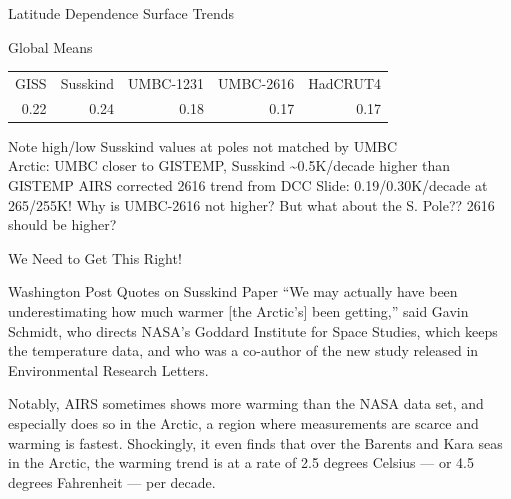 \documentclass[10pt,t]{beamer}
\begin{document}
\begin{frame}[label={sec:org564d78e}]{Latitude Dependence Surface Trends}
\vspace{-0.15in}
\begin{footnotesize}
Global Means
\vspace{-0.1in}
\begin{center}
\begin{tabular}{rrrrr}
GISS & Susskind & UMBC-1231 & UMBC-2616 & HadCRUT4\\
0.22 & 0.24 & 0.18 & 0.17 & 0.17\\
\end{tabular}
\end{center}
\vspace{-0.03in}
\end{footnotesize}
\begin{footnotesize}
Note high/low Susskind values at poles not matched by UMBC\\
Arctic: UMBC closer to GISTEMP, Susskind \textasciitilde{}0.5K/decade higher than GISTEMP
AIRS corrected 2616 trend from DCC Slide: 0.19/0.30K/decade at 265/255K!
Why is UMBC-2616 not higher?
But what about the S. Pole??  2616 should be higher?
\end{footnotesize}
\end{frame}

\begin{frame}[label={sec:orgacff5db}]{We Need to Get This Right!}
\begin{block}{Washington Post Quotes on Susskind Paper}
\vspace{0.2in}
“We may actually have been underestimating how much warmer [the Arctic’s]
been getting,” said Gavin Schmidt, who directs NASA’s Goddard Institute for
Space Studies, which keeps the temperature data, and who was a co-author of
the new study released in Environmental Research Letters.

Notably, AIRS sometimes shows more warming than the NASA data set, and
especially does so in the Arctic, a region where measurements are scarce
and warming is fastest. Shockingly, it even finds that over the Barents and
Kara seas in the Arctic, the warming trend is at a rate of 2.5 degrees
Celsius — or 4.5 degrees Fahrenheit — per decade.
\end{block}
\end{frame}
\end{document}
